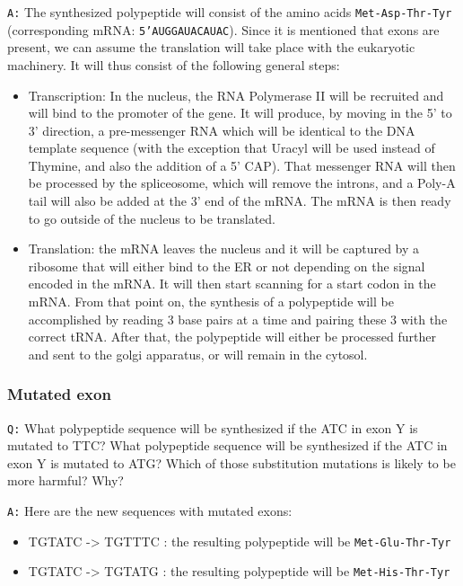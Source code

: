 \documentclass[11pt, a4paper,titlepage]{article}
\begin{document}
\texttt{A:} The synthesized polypeptide will consist of the amino acids
\texttt{Met-Asp-Thr-Tyr} (corresponding mRNA: \texttt{5'AUGGAUACAUAC}). Since it is
mentioned that exons are present, we can assume the translation will
take place with the eukaryotic machinery. It will thus consist of the
following general steps:

\begin{itemize}
\item Transcription: In the nucleus, the RNA Polymerase II will be
  recruited and will bind to the promoter of the gene. It will
  produce, by moving in the 5' to 3' direction, a pre-messenger RNA
  which will be identical to the DNA template sequence (with the
  exception that Uracyl will be used instead of Thymine, and also the
  addition of a 5' CAP). That messenger RNA will then be processed by
  the spliceosome, which will remove the introns, and a Poly-A tail
  will also be added at the 3' end of the mRNA. The mRNA is then
  ready to go outside of the nucleus to be translated.
\item Translation: the mRNA leaves the nucleus and it will be captured by
  a ribosome that will either bind to the ER or not depending on the
  signal encoded in the mRNA. It will then start scanning for a start
  codon in the mRNA. From that point on, the synthesis of a
  polypeptide will be accomplished by reading 3 base pairs at a time
  and pairing these 3 with the correct tRNA. After that, the
  polypeptide will either be processed further and sent to the golgi
  apparatus, or will remain in the cytosol.
\end{itemize}
\subsubsection{Mutated exon}
\label{sec-1-2-3}

\texttt{Q:} What polypeptide sequence will be synthesized if the ATC in exon
Y is mutated to TTC? What polypeptide sequence will be synthesized if
the ATC in exon Y is mutated to ATG? Which of those substitution
mutations is likely to be more harmful? Why?

\texttt{A:} Here are the new sequences with mutated exons:

\begin{itemize}
\item TGTATC -> TGTTTC : the resulting polypeptide will be \texttt{Met-Glu-Thr-Tyr}
\item TGTATC -> TGTATG : the resulting polypeptide will be \texttt{Met-His-Thr-Tyr}
\end{itemize}
\end{document}
